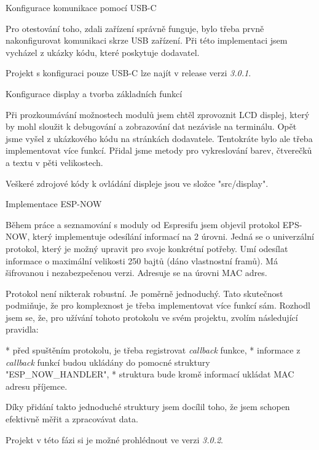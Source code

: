 \sec Konfigurace komunikace pomocí USB-C

Pro otestování toho, zdali zařízení správně funguje, bylo třeba prvně nakonfigurovat komunikaci skrze USB zařízení. Při této implementaci jsem vycházel z ukázky kódu, které poskytuje dodavatel.

Projekt s konfiguraci pouze USB-C lze najít v release verzi {\em 3.0.1}.

\sec Konfigurace display a tvorba základních funkcí

Při prozkoumávání možnostech modulů jsem chtěl zprovoznit LCD displej, který by mohl sloužit k debugování a zobrazování dat nezávisle na terminálu. Opět jsme vyšel z ukázkového kódu na stránkách dodavatele. Tentokráte bylo ale třeba implementovat více funkcí. Přidal jsme metody pro vykreslování barev, čtverečků a textu v pěti velikostech.

Veškeré zdrojové kódy k ovládání displeje jsou ve složce "src/display".

\sec Implementace ESP-NOW

Během práce a seznamování s moduly od Espresifu jsem objevil protokol EPS-NOW, který implementuje odesílání informací na 2 úrovni. Jedná se o univerzální protokol, který je možný upravit pro svoje konkrétní potřeby. Umí odesílat informace o maximální velikosti 250 bajtů (dáno vlastnostní framů). Má šifrovanou i nezabezpečenou verzi. Adresuje se na úrovni MAC adres.

Protokol není nikterak robustní. Je poměrně jednoduchý. Tato skutečnost podmiňuje, že pro komplexnost je třeba implementovat více funkcí sám. Rozhodl jsem se, že, pro užívání tohoto protokolu ve svém projektu, zvolím následující pravidla:

\begitems
* před spuštěním protokolu, je třeba registrovat {\em callback} funkce,
* informace z {\em callback} funkcí budou ukládány do pomocné struktury "ESP_NOW_HANDLER",
* struktura bude kromě informací ukládat MAC adresu příjemce.
\enditems

Díky přidání takto jednoduché struktury jsem docílil toho, že jsem schopen efektivně měřit a zpracovávat data.

Projekt v této fázi si je možné prohlédnout ve verzi {\em 3.0.2}.

